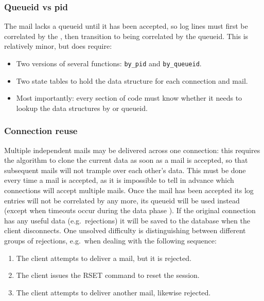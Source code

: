 \subsubsection{Queueid vs pid}

The mail lacks a queueid until it has been accepted, so log lines must
first be correlated by the  \pid{}, then transition to being
correlated by the queueid.  This is relatively minor, but does require:

\begin{itemize}

    \item Two versions of several functions: \texttt{by\_pid} and
        \texttt{by\_queueid}.

    \item Two state tables to hold the data structure for each connection
        and mail.

    \item Most importantly: every section of code must know whether it
        needs to lookup the data structures by \pid{} or queueid.

\end{itemize}

\subsubsection{Connection reuse}

\label{connection reuse}

Multiple independent mails may be delivered across one connection: this
requires the algorithm to clone the current data as soon as a mail is
accepted, so that subsequent mails will not trample over each other's data.
This must be done every time a mail is accepted, as it is impossible to
tell in advance which connections will accept multiple mails.  Once the
mail has been accepted its log entries will not be correlated by \pid{} any
more, its queueid will be used instead (except when timeouts occur during
the data phase ).  If the original
connection has any useful data (e.g.\ rejections) it will be saved to the
database when the client disconnects.  One unsolved difficulty is
distinguishing between different groups of rejections, e.g.\ when dealing
with the following sequence:

\begin{enumerate}

    \item The client attempts to deliver a mail, but it is rejected.

    \item The client issues the RSET command to reset the \SMTP{} session.

    \item The client attempts to deliver another mail, likewise rejected.

\end{enumerate}

